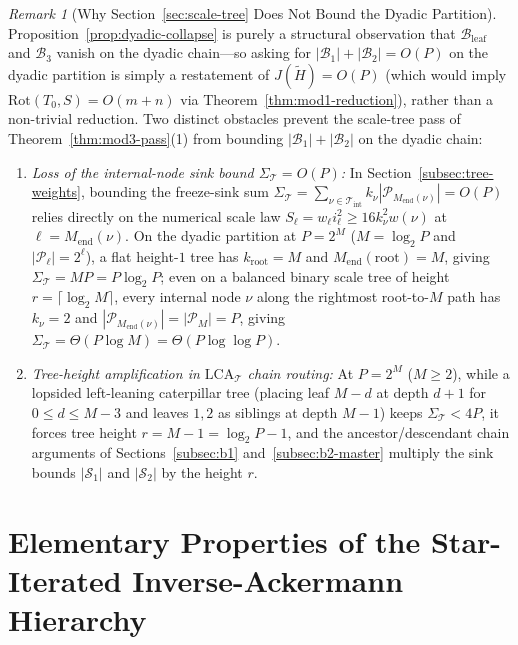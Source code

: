 \documentclass[11pt]{article}
\theoremstyle{definition}
\theoremstyle{remark}
\newtheorem{remark}[theorem]{Remark}
\newcommand{\LCA}{\mathrm{LCA}}
\newcommand{\Rot}{\mathrm{Rot}}
\begin{document}
\begin{remark}[Why Section~\ref{sec:scale-tree} Does Not Bound the Dyadic Partition]
\label{rem:dyadic-obstacle}
Proposition~\ref{prop:dyadic-collapse} is purely a structural observation that $\mathcal{B}_{\mathrm{leaf}}$ and $\mathcal{B}_3$ vanish on the dyadic chain---so asking for $|\mathcal{B}_1| + |\mathcal{B}_2| = O(P)$ on the dyadic partition is simply a restatement of $J(\widetilde{H}) = O(P)$ (which would imply $\Rot(T_0, S) = O(m + n)$ via Theorem~\ref{thm:mod1-reduction}), rather than a non-trivial reduction. Two distinct obstacles prevent the scale-tree pass of Theorem~\ref{thm:mod3-pass}(1) from bounding $|\mathcal{B}_1| + |\mathcal{B}_2|$ on the dyadic chain:
\begin{enumerate}[label=(\arabic*)]
  \item \emph{Loss of the internal-node sink bound $\Sigma_{\mathcal{T}} = O(P)$:} In Section~\ref{subsec:tree-weights}, bounding the freeze-sink sum $\Sigma_{\mathcal{T}} = \sum_{\nu \in \mathcal{T}_{\mathrm{int}}} k_\nu |\mathcal{P}_{M_{\mathrm{end}}(\nu)}| = O(P)$ relies directly on the numerical scale law $S_\ell = w_\ell i_\ell^2 \ge 16 k_\nu^2 w(\nu)$ at $\ell = M_{\mathrm{end}}(\nu)$. On the dyadic partition at $P = 2^M$ ($M = \log_2 P$ and $|\mathcal{P}_\ell| = 2^\ell$), a flat height-$1$ tree has $k_{\mathrm{root}} = M$ and $M_{\mathrm{end}}(\mathrm{root}) = M$, giving $\Sigma_{\mathcal{T}} = M P = P \log_2 P$; even on a balanced binary scale tree of height $r = \lceil \log_2 M \rceil$, every internal node $\nu$ along the rightmost root-to-$M$ path has $k_\nu = 2$ and $|\mathcal{P}_{M_{\mathrm{end}}(\nu)}| = |\mathcal{P}_M| = P$, giving $\Sigma_{\mathcal{T}} = \Theta(P \log M) = \Theta(P \log\log P)$.
  \item \emph{Tree-height amplification in $\LCA_{\mathcal{T}}$ chain routing:} At $P = 2^M$ ($M \ge 2$), while a lopsided left-leaning caterpillar tree (placing leaf $M - d$ at depth $d + 1$ for $0 \le d \le M - 3$ and leaves $1, 2$ as siblings at depth $M - 1$) keeps $\Sigma_{\mathcal{T}} < 4P$, it forces tree height $r = M - 1 = \log_2 P - 1$, and the ancestor/descendant chain arguments of Sections~\ref{subsec:b1} and~\ref{subsec:b2-master} multiply the sink bounds $|\mathcal{S}_1|$ and $|\mathcal{S}_2|$ by the height $r$.
\end{enumerate}
\end{remark}


\appendix
\section{Elementary Properties of the Star-Iterated Inverse-Ackermann Hierarchy}
\label{app:ackermann}
\end{document}
